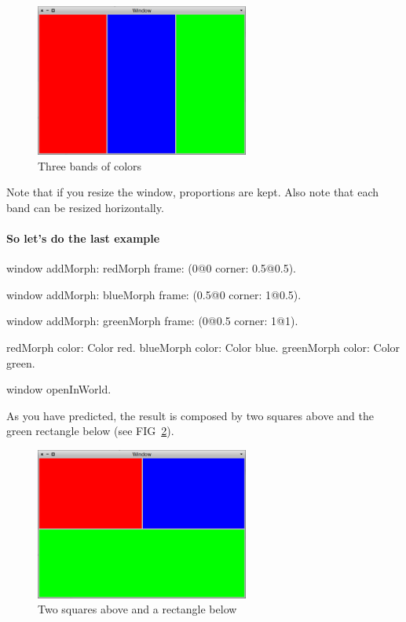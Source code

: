 \documentclass[a4paper,10pt,twoside]{book}
\begin{document}
\begin{figure}[ht]\centering
	\includegraphics[width=7cm]{SimpleLayoutExample2}
	\caption{Three bands of colors}
	\label{fig:simpleLayoutExample2}
\end{figure}

Note that if you resize the window, proportions are kept.
Also note that each band can be resized horizontally.

\paragraph{So let's do the last example}

\begin{code}{}
window
	addMorph: redMorph
	frame: (0@0 corner: 0.5@0.5).

window
	addMorph: blueMorph
	frame: (0.5@0 corner: 1@0.5).

window
	addMorph: greenMorph
	frame: (0@0.5 corner: 1@1).

redMorph color: Color red.
blueMorph color: Color blue.
greenMorph color: Color green.
	
window openInWorld.
\end{code}

As you have predicted, the result is composed by two squares above and the green rectangle below (see FIG~\ref{fig:simpleLayoutExample3}).

\begin{figure}[ht]\centering
	\includegraphics[width=7cm]{SimpleLayoutExample3}
	\caption{Two squares above and a rectangle below}
	\label{fig:simpleLayoutExample3}
\end{figure}
\end{document}
